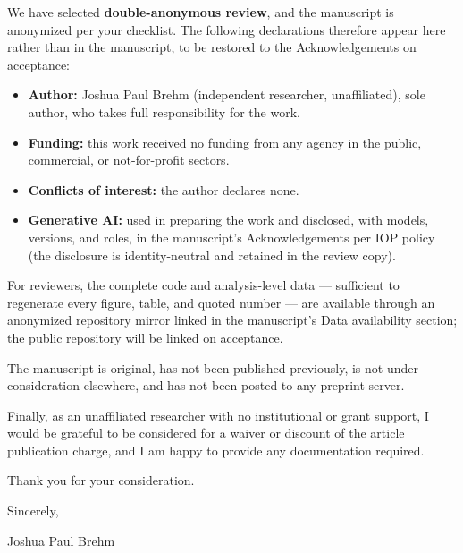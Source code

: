 \documentclass[11pt]{article}
\begin{document}
We have selected \textbf{double-anonymous review}, and the manuscript is
anonymized per your checklist. The following declarations therefore appear
here rather than in the manuscript, to be restored to the Acknowledgements
on acceptance:

\begin{itemize}
  \item \textbf{Author:} Joshua Paul Brehm (independent researcher,
    unaffiliated), sole author, who takes full responsibility for the work.
  \item \textbf{Funding:} this work received no funding from any agency in
    the public, commercial, or not-for-profit sectors.
  \item \textbf{Conflicts of interest:} the author declares none.
  \item \textbf{Generative AI:} used in preparing the work and disclosed,
    with models, versions, and roles, in the manuscript's Acknowledgements
    per IOP policy (the disclosure is identity-neutral and retained in the
    review copy).
\end{itemize}

For reviewers, the complete code and analysis-level data --- sufficient to
regenerate every figure, table, and quoted number --- are available through
an anonymized repository mirror linked in the manuscript's Data availability
section; the public repository will be linked on acceptance.

The manuscript is original, has not been published previously, is not under
consideration elsewhere, and has not been posted to any preprint server.

Finally, as an unaffiliated researcher with no institutional or grant
support, I would be grateful to be considered for a waiver or discount of
the article publication charge, and I am happy to provide any documentation
required.

Thank you for your consideration.

\vspace{2ex}
Sincerely,

Joshua Paul Brehm
\end{document}
